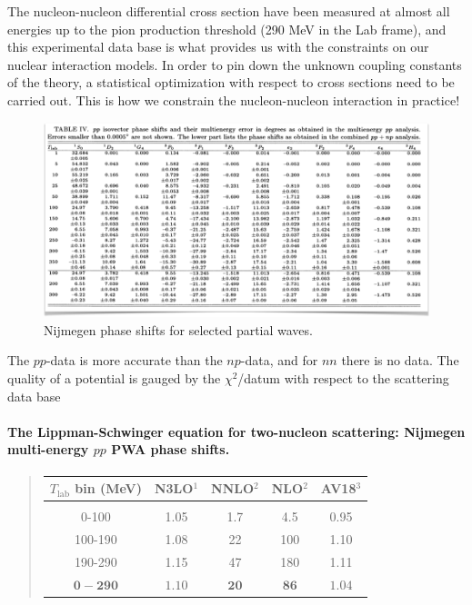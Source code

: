 \documentclass[%
oneside,                 %
final,                   %
10pt]{article}
\begin{document}
The nucleon-nucleon differential cross section
have been measured at almost all energies up to the pion production
threshold (290 MeV in the Lab frame), and this experimental data base
is what provides us with the constraints on our nuclear interaction
models. In order to pin down the unknown coupling constants of the
theory, a statistical optimization with respect to cross sections need
to be carried out. This is how we constrain the nucleon-nucleon
interaction in practice!


\begin{figure}[t]
  \centerline{\includegraphics[width=1.0\linewidth]{fig-forces/nijmegen_pp_phase_shifts.png}}
  \caption{
  Nijmegen phase shifts for selected partial waves.
  }
\end{figure}


The $pp$-data is more accurate than the $np$-data, and for $nn$ there is no data. The quality of a potential is gauged by the $\chi^2$/datum with respect to the scattering data base

\paragraph{The Lippman-Schwinger equation for two-nucleon scattering: Nijmegen multi-energy $pp$ PWA phase shifts.}

\begin{quote}
\begin{tabular}{ccccc}
\hline
\multicolumn{1}{c}{ $T_{\mathrm{lab}}$ bin (MeV) } & \multicolumn{1}{c}{ N3LO$^1$ } & \multicolumn{1}{c}{ NNLO$^2$ } & \multicolumn{1}{c}{ NLO$^2$ } & \multicolumn{1}{c}{ AV18$^3$ } \\
\hline
                             &                 &               &               &                 \\
0-100                        & 1.05            & 1.7           & 4.5           & 0.95            \\
100-190                      & 1.08            & 22            & 100           & 1.10            \\
190-290                      & 1.15            & 47            & 180           & 1.11            \\
$\mathbf{0-290}$             & $\mathbf{1.10}$ & $\mathbf{20}$ & $\mathbf{86}$ & $\mathbf{1.04}$ \\
\hline
\end{tabular}
\end{quote}
\end{document}
